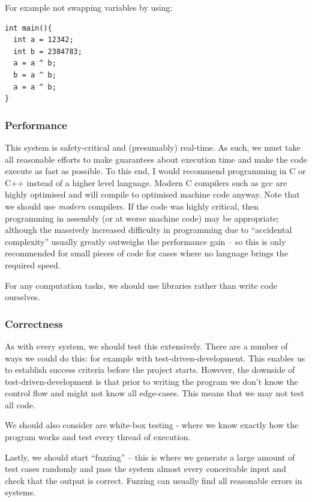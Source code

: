 \documentclass[10pt,\jkfside,a4paper]{article}
\begin{document}
\begin{enumerate}
\begin{enumerate}[label=(\alph*)]
For example not swapping variables by using:

\begin{lstlisting}[style=cstyle,label={lst:swap_no_temp}]
int main(){
  int a = 12342;
  int b = 2384783;
  a = a ^ b;
  b = a ^ b;
  a = a ^ b;
}
\end{lstlisting}

\subsubsection*{Performance}

This system is safety-critical and (presumably) real-time.
As such, we must take all reasonable efforts to make guarantees about execution time and make the code execute as
fast as possible.
To this end, I would recommend programming in C or C++ instead of a higher level language.
Modern C compilers such as gcc are highly optimised and will compile to optimised
machine code anyway. Note that we should use \textit{modern} compilers.
If the code was highly critical, then programming in assembly (or at worse machine code)
may be appropriate; although the massively increased difficulty in programming due to
``accidental complexity'' usually greatly outweighs the performance gain -- so this is only
recommended for small pieces of code for cases where no language brings the required
speed.

For any computation tasks, we should use libraries rather than write code ourselves.

\subsubsection*{Correctness}

As with every system, we should test this extensively.
There are a number of ways we could do this: for example with test-driven-development.
This enables us to establish success criteria before the project starts.
However, the downside of test-driven-development is that prior to writing the program
we don't know the control flow and might not know all edge-cases.
This means that we may not test all code.

We should also consider are white-box testing - where we know exactly how the program
works and test every thread of execution.

Lastly, we should start ``fuzzing'' -- this is where we generate a large amount of test cases randomly
and pass the system almost every conceivable input and check that the output is correct.
Fuzzing can usually find all reasonable errors in systems.


\end{enumerate}
\end{enumerate}
\end{document}
